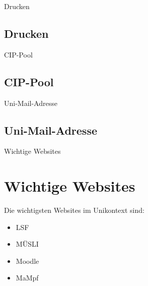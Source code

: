 \begin{frame}{Drucken}
  \subsection{Drucken}
\end{frame}


\begin{frame}{CIP-Pool}
  \subsection{CIP-Pool}
\end{frame}


\begin{frame}{Uni-Mail-Adresse}
  \subsection{Uni-Mail-Adresse}
\end{frame}


\begin{frame}{Wichtige Websites}
  \section{Wichtige Websites}
  Die wichtigsten Websites im Unikontext sind:
    \begin{itemize}
      \item{LSF}
      \item{MÜSLI}
      \item{Moodle}
      \item{MaMpf}
    \end{itemize}
\end{frame}


